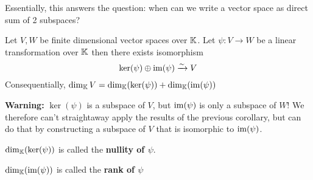 
\begin{remark}
    Essentially, this answers the question: when can we write a vector space as direct sum of 2 subspaces?
\end{remark}

\begin{proposition}
    Let \(V, W\) be finite dimensional vector spaces over \(\mathbb{K}\). Let \(\psi: V \to W\) be a linear transformation over \(\mathbb{K}\) then there exists isomorphism \[
    \ker(\psi) \oplus \mathrm{im}(\psi) \xrightarrow{\sim} V
    \]
    Consequentially, \(\dim_{\mathbb{K}} V = \dim_{\mathbb{K}}(\ker(\psi)) + \dim_{\mathbb{K}}(\mathrm{im}(\psi))\)

    \textbf{Warning:} \(\ker(\psi)\) is a subspace of \(V\), but \(\mathrm{im}(\psi)\) is only a subspace of \(W\)! We therefore can't straightaway apply the results of the previous corollary, but can do that by constructing a subspace of \(V\) that is isomorphic to \(\mathrm{im}(\psi)\).
\end{proposition}

\begin{remark}
    \(\dim_{\mathbb{K}}(\ker(\psi))\) is called the \textbf{nullity of \(\psi\)}.

    \(\dim_{\mathbb{K}}(\mathrm{im}(\psi))\) is called the \textbf{rank of \(\psi\)}
\end{remark}

